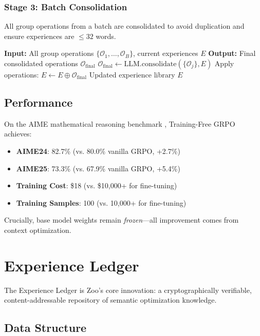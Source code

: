 \documentclass[11pt,a4paper]{article}
\begin{document}
\subsubsection{Stage 3: Batch Consolidation}

All group operations from a batch are consolidated to avoid duplication and ensure experiences are $\leq 32$ words.

\begin{algorithm}[H]
\caption{Batch Consolidation}
\begin{algorithmic}[1]
\STATE \textbf{Input:} All group operations $\{\mathcal{O}_1, \ldots, \mathcal{O}_B\}$, current experiences $E$
\STATE \textbf{Output:} Final consolidated operations $\mathcal{O}_{\text{final}}$
\STATE $\mathcal{O}_{\text{final}} \leftarrow \text{LLM.consolidate}(\{\mathcal{O}_j\}, E)$
\STATE Apply operations: $E \leftarrow E \oplus \mathcal{O}_{\text{final}}$
\RETURN Updated experience library $E$
\end{algorithmic}
\end{algorithm}

\subsection{Performance}

On the AIME mathematical reasoning benchmark \cite{hendrycks2021math}, Training-Free GRPO achieves:
\begin{itemize}
\item \textbf{AIME24}: 82.7\% (vs. 80.0\% vanilla GRPO, +2.7\%)
\item \textbf{AIME25}: 73.3\% (vs. 67.9\% vanilla GRPO, +5.4\%)
\item \textbf{Training Cost}: \$18 (vs. \$10,000+ for fine-tuning)
\item \textbf{Training Samples}: 100 (vs. 10,000+ for fine-tuning)
\end{itemize}

Crucially, base model weights remain \textit{frozen}—all improvement comes from context optimization.

\section{Experience Ledger}

The Experience Ledger is Zoo's core innovation: a cryptographically verifiable, content-addressable repository of semantic optimization knowledge.

\subsection{Data Structure}
\end{document}
